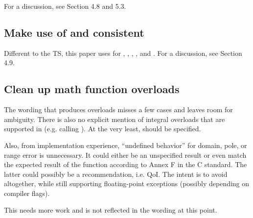 For a discussion, see  Section 4.8 and 5.3.

\subsection{Make use of  and  consistent}

Different to the TS, this paper uses  for
\stdx\simdabi{}, \stdx{},
\stdx{}, \stdx{}, and
\stdx\simdabi{}.
For a discussion, see  Section 4.9.

\subsection{Clean up math function overloads}
The wording that produces  overloads misses a few cases and leaves room for ambiguity.
There is also no explicit mention of integral overloads that are supported in  (e.g. \std{} calling \std{}).
At the very least, \std{} should be specified.

Also, from implementation experience, ``undefined behavior'' for domain, pole,
or range error is unnecessary.
It could either be an unspecified result or even match the expected result of
the function according to Annex F in the C standard.
The latter could possibly be a recommendation, i.e. QoI.
The intent is to avoid  altogether, while still supporting
floating-point exceptions (possibly depending on compiler flags).

This needs more work and is not reflected in the wording at this point.

